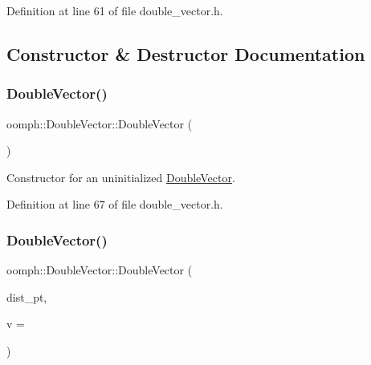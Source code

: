 Definition at line 61 of file double\+\_\+vector.\+h.



\subsection{Constructor \& Destructor Documentation}
\mbox{\label{classoomph_1_1DoubleVector_a786d26f4034f2ae10c9d26542642661f}} 
\subsubsection{\texorpdfstring{Double\+Vector()}{DoubleVector()}\hspace{0.1cm}{\footnotesize\ttfamily [1/4]}}
{\footnotesize\ttfamily oomph\+::\+Double\+Vector\+::\+Double\+Vector (\begin{DoxyParamCaption}{ }\end{DoxyParamCaption})\hspace{0.3cm}{\ttfamily [inline]}}



Constructor for an uninitialized \hyperlink{classoomph_1_1DoubleVector}{Double\+Vector}. 



Definition at line 67 of file double\+\_\+vector.\+h.

\mbox{\label{classoomph_1_1DoubleVector_a21f824524cd7bc779af3cbdbfe1d3ef8}} 
\subsubsection{\texorpdfstring{Double\+Vector()}{DoubleVector()}\hspace{0.1cm}{\footnotesize\ttfamily [2/4]}}
{\footnotesize\ttfamily oomph\+::\+Double\+Vector\+::\+Double\+Vector (\begin{DoxyParamCaption}\item[{const \hyperlink{classoomph_1_1LinearAlgebraDistribution}{Linear\+Algebra\+Distribution} $\ast$const \&}]{dist\+\_\+pt,  }\item[{const double \&}]{v = {} }\end{DoxyParamCaption})\hspace{0.3cm}{\ttfamily [inline]}}



